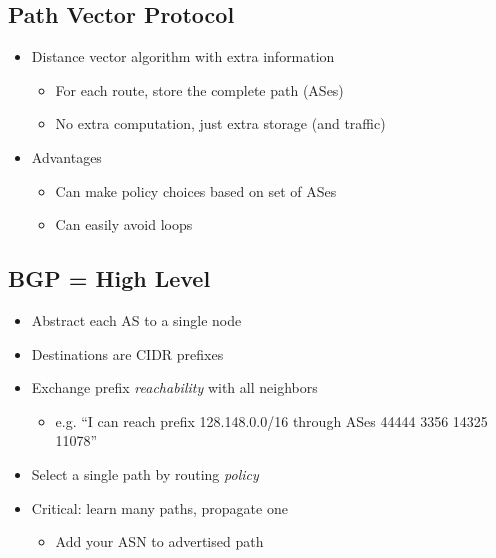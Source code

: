 \subsection{Path Vector Protocol}
\begin{itemize}[nosep]
    \item Distance vector algorithm with extra information
          \begin{itemize}[nosep]
              \item For each route, store the complete path (ASes)
              \item No extra computation, just extra storage (and traffic)
          \end{itemize}
    \item Advantages
          \begin{itemize}[nosep]
              \item Can make policy choices based on set of ASes
              \item Can easily avoid loops
          \end{itemize}
\end{itemize}

\begin{figure}[H]
\end{figure}
\subsection{BGP = High Level}
\begin{itemize}[nosep]
    \item Abstract each AS to a single node
    \item Destinations are CIDR prefixes
    \item Exchange prefix \emph{reachability} with all neighbors
          \begin{itemize}[nosep]
              \item e.g. ``I can reach prefix 128.148.0.0/16 through ASes 44444 3356 14325 11078''
          \end{itemize}
    \item Select a single path by routing \emph{policy}
    \item Critical: learn many paths, propagate one
          \begin{itemize}[nosep]
              \item Add your ASN to advertised path
          \end{itemize}
\end{itemize}
